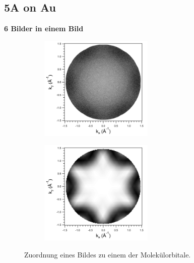         \subsection{5A on Au}
        \textbf{6 Bilder in einem Bild}
            \begin{figure}
                \label{fig:MOT}
                \centering
                \begin{subfigure}{0.48\textwidth}
                    \centering
                    \includegraphics[height=5cm]{./content/Au+5A/IMAGE_2021_06_17_005_BE0_8}
                \end{subfigure}
                \begin{subfigure}{0.48\textwidth}
                    \centering
                    \includegraphics[height=5cm]{./content/Au+5A/HOMO1_all_CT}
                \end{subfigure}
                \caption{Zuordnung eines Bildes zu einem der Molekülorbitale.}
            \end{figure}
